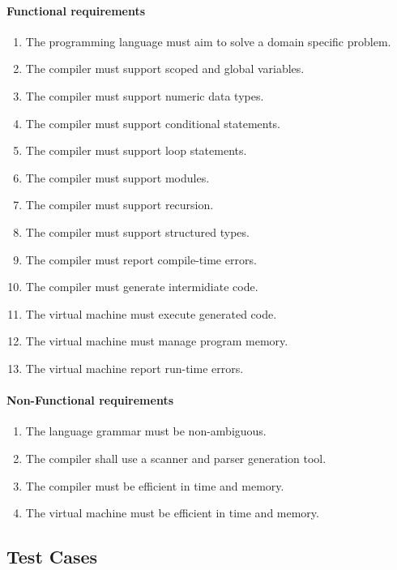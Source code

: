 \paragraph{Functional requirements}
\begin{enumerate}
    \item The programming language must aim to solve a domain specific problem.
    \item The compiler must support scoped and global variables.
    \item The compiler must support numeric data types.
    \item The compiler must support conditional statements.
    \item The compiler must support loop statements.
    \item The compiler must support modules.
    \item The compiler must support recursion.
    \item The compiler must support structured types.
    \item The compiler must report compile-time errors.
    \item The compiler must generate intermidiate code.
    \item The virtual machine must execute generated code.
    \item The virtual machine must manage program memory.
    \item The virtual machine report run-time errors.
\end{enumerate}

\paragraph{Non-Functional requirements}
\begin{enumerate}
    \item The language grammar must be non-ambiguous.
    \item The compiler shall use a scanner and parser generation tool.
    \item The compiler must be efficient in time and memory.
    \item The virtual machine must be efficient in time and memory.
\end{enumerate}

\newpage

\subsection{Test Cases}

